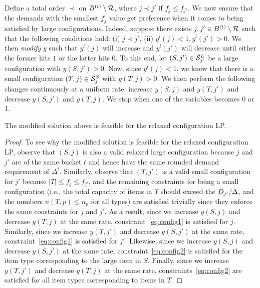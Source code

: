 \medskip {}  Define a total order $\prec$ on $B^{(t)} \setminus {\cal R}$, where $j \prec j'$ if $f_{j} \leq f_{j'}$.  We now ensure that the demands with the smallest $f_j$ value get preference when it comes to being satisfied by large configurations. Indeed, suppose there exists $j,j' \in B^{(t)} \setminus {\cal R}$ such that the following conditions hold: (i) $j \prec j'$, (ii) $y^l(j) < 1, y^l(j') > 0$. We then \emph{modify} $y$ such that
$y^l(j)$ will increase and $y^l(j')$ will decrease until either the former hits $1$ or the latter hits $0$. To this end, let $(S,j') \in \bar{\cal S}^L_{j'}$ be a large configuration  with $y(S,j') > 0$. Now, since $y^l(j) < 1$, we know that there is a small configuration $(T,j) \in \bar{\cal S}^S_j$ with $y(T,j) > 0$. We then perform the following changes continuously at a uniform rate: increase $y(S,j)$ and $y(T,j')$ and decrease $y(S,j')$ and $y(T,j)$. We stop when one of the variables becomes 0 or 1.

\begin{claim} \label{cl:swap1}
The modified solution above is feasible for the relaxed configuration LP.
\end{claim}
\begin{proof}
To see why the modified solution is feasible for the relaxed configuration LP, observe that $(S,j)$ is also a valid relaxed large configuration because $j$ and $j'$ are of the same bucket $t$ and hence have the same rounded demand requirement of $\Delta^t$. Similarly, observe that $(T,j')$ is a valid small configuration for $j'$ because $|T| \leq f_{j} \leq f_{j'}$, and the remaining constraints for being a small configuration (i.e., the total capacity of items in $T$ should exceed the ${\bar D}_{j'}/\Delta$, and the numbers $n(T,p) \leq n_p$ for all types) are satisfied trivially since they enforce the same constraints for $j$ and $j'$. As a result, since we increase $y(S,j)$ and decrease $y(T,j)$ at the same rate, constraint~\cref{eq:config1} is satisfied for $j$. Similarly, since we increase $y(T,j')$ and decrease $y(S,j')$ at the same rate, constraint~\cref{eq:config1} is satisfied for $j'$. Likewise, since we increase $y(S,j)$ and decrease $y(S,j')$ at the same rate, constraint~\cref{eq:config2} is satisfied for the item type corresponding to the large item in $S$. Finally, since we increase $y(T,j')$ and decrease $y(T,j)$ at the same rate, constraints~\cref{eq:config2} are satisfied for all item types corresponding to items in $T$.
\end{proof}

